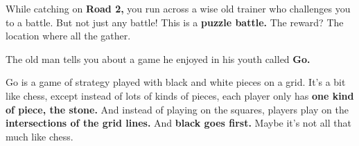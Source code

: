 

While catching \mappMobimon{} on \textbf{Road 2,} you run across a wise old
\mappMobimon{} trainer who challenges you to a \mappMobimon{} battle. But not
just any \mappMobimon{} battle! This is a \textbf{puzzle battle.} The reward?
The location where all the \mappMobimon{} gather.

The old man tells you about a game he enjoyed in his youth called \textbf{Go.}

Go is a game of strategy played with black and white pieces on a grid. It's a
bit like chess, except instead of lots of kinds of pieces, each player only has
\textbf{one kind of piece, the stone.} And instead of playing on the squares,
players play on the \textbf{intersections of the grid lines.} And \textbf{black
  goes first.} Maybe it's not all that much like chess.


